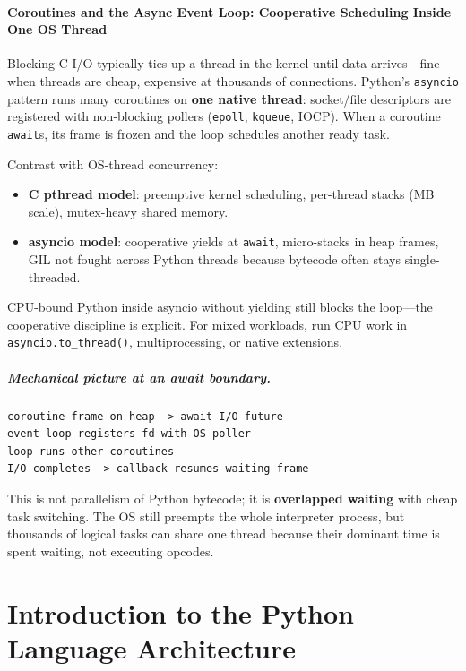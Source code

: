 \documentclass[a4paper,twoside]{report}
\begin{document}
\subsubsection{Coroutines and the Async Event Loop: Cooperative Scheduling Inside One OS Thread}

Blocking C I/O typically ties up a thread in the kernel until data arrives---fine when threads are cheap, expensive at thousands of connections. Python's \texttt{asyncio} pattern runs many coroutines on \textbf{one native thread}: socket/file descriptors are registered with non-blocking pollers (\texttt{epoll}, \texttt{kqueue}, IOCP). When a coroutine \texttt{await}s, its frame is frozen and the loop schedules another ready task.

Contrast with OS-thread concurrency:
\begin{itemize}
    \item \textbf{C pthread model}: preemptive kernel scheduling, per-thread stacks (MB scale), mutex-heavy shared memory.
    \item \textbf{asyncio model}: cooperative yields at \texttt{await}, micro-stacks in heap frames, GIL not fought across Python threads because bytecode often stays single-threaded.
\end{itemize}

CPU-bound Python inside asyncio without yielding still blocks the loop---the cooperative discipline is explicit. For mixed workloads, run CPU work in \texttt{asyncio.to\_thread()}, multiprocessing, or native extensions.

\paragraph{Mechanical picture at an await boundary.}
\begin{verbatim}
coroutine frame on heap -> await I/O future
event loop registers fd with OS poller
loop runs other coroutines
I/O completes -> callback resumes waiting frame
\end{verbatim}

This is not parallelism of Python bytecode; it is \textbf{overlapped waiting} with cheap task switching. The OS still preempts the whole interpreter process, but thousands of logical tasks can share one thread because their dominant time is spent waiting, not executing opcodes.


\chapter{Introduction to the Python Language Architecture}
\end{document}
